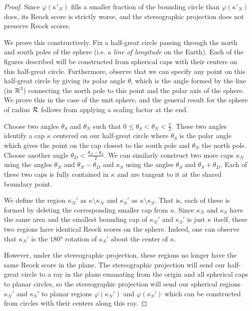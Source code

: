 \begin{proof}
{  Since $\varphi(\kappa'_N)$ fills a smaller fraction of the bounding
  circle than $\varphi(\kappa'_N)$ does, its Reock score is strictly
  worse, and the stereographic projection does not preserve Reock
  scores.
}
  
  We prove this constructively.  Fix a half-great circle passing through the north and south poles of the sphere (i.e. a \textit{line of longitude} on the Earth).  Each of the figures described will be constructed from spherical caps with their centers on this half-great circle.  Furthermore, observe that we can specify any point on this half-great circle by giving its polar angle $\theta$, which is the angle formed by the line (in $\mathbb{R}^3$) connecting the north pole to this point and the polar axis of the sphere.
  We prove this in the case of the unit sphere, and the general result for the sphere of radius $\mathcal{R}$ follows from applying a scaling factor at the end.
  
  Choose two angles $\theta_S$ and $\theta_N$ such that $0\leq\theta_S<\theta_N<\tfrac{\pi}{2}$.  These two angles identify a cap $\kappa$ centered on our half-great circle where $\theta_S$ is the polar angle which gives the point on the cap closest to the south pole and $\theta_N$ the north pole.  Choose another angle $\theta_D <\tfrac{\theta_N-\theta_S}{2}$.  We can similarly construct two more caps $\kappa_N$ using the angles $\theta_N$ and $\theta_N - \theta_D$ and $\kappa_S$ using the angles $\theta_S$ and $\theta_S+\theta_D$.  Each of these two caps is fully contained in $\kappa$ and are tangent to it at the shared boundary point.
  
  We define the region $\kappa_N'$ as $\kappa\setminus\kappa_N$ and $\kappa_S'$ as $\kappa\setminus\kappa_S$.  That is, each of these is formed by deleting the corresponding smaller cap from $\kappa$.  Since $\kappa_N$ and $\kappa_S$ have the same area and the smallest bounding cap of $\kappa_N'$ and $\kappa_S'$ is just $\kappa$ itself, these two regions have identical Reock scores on the sphere.  Indeed, one can observe that $\kappa_N'$ is the $\ang{180}$ rotation of $\kappa_S'$ about the center of $\kappa$.
  
  However, under the stereographic projection, these regions no longer have the same Reock score in the plane.  The stereographic projection will send our half-great circle to a ray in the plane emanating from the origin and all spherical caps to planar circles, so the stereographic projection will send our spherical regions $\kappa_N'$ and $\kappa_S'$ to planar regions $\varphi(\kappa_N')$ and $\varphi(\kappa_S')$ which can be constructed from circles with their centers along this ray.
  

\end{proof}
